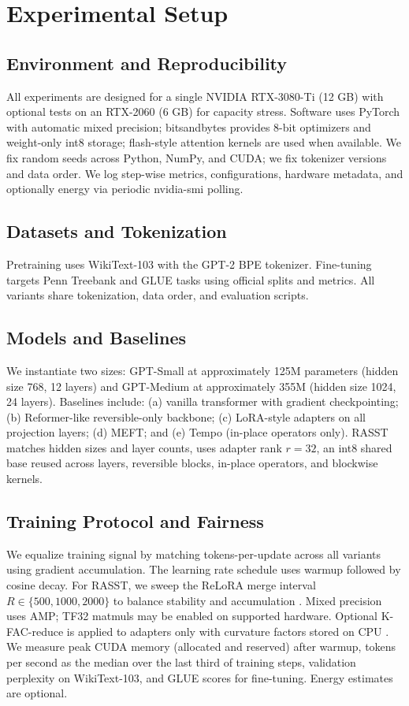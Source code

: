 \documentclass{article}
\begin{document}
\section{Experimental Setup}
\subsection{Environment and Reproducibility}
All experiments are designed for a single NVIDIA RTX-3080-Ti (12 GB) with optional tests on an RTX-2060 (6 GB) for capacity stress. Software uses PyTorch with automatic mixed precision; bitsandbytes provides 8-bit optimizers and weight-only int8 storage; flash-style attention kernels are used when available. We fix random seeds across Python, NumPy, and CUDA; we fix tokenizer versions and data order. We log step-wise metrics, configurations, hardware metadata, and optionally energy via periodic nvidia-smi polling.

\subsection{Datasets and Tokenization}
Pretraining uses WikiText-103 with the GPT-2 BPE tokenizer. Fine-tuning targets Penn Treebank and GLUE tasks using official splits and metrics. All variants share tokenization, data order, and evaluation scripts.

\subsection{Models and Baselines}
We instantiate two sizes: GPT-Small at approximately 125M parameters (hidden size 768, 12 layers) and GPT-Medium at approximately 355M (hidden size 1024, 24 layers). Baselines include: (a) vanilla transformer with gradient checkpointing; (b) Reformer-like reversible-only backbone; (c) LoRA-style adapters on all projection layers; (d) MEFT; and (e) Tempo (in-place operators only). RASST matches hidden sizes and layer counts, uses adapter rank \(r = 32\), an int8 shared base reused across layers, reversible blocks, in-place operators, and blockwise kernels.

\subsection{Training Protocol and Fairness}
We equalize training signal by matching tokens-per-update across all variants using gradient accumulation. The learning rate schedule uses warmup followed by cosine decay. For RASST, we sweep the ReLoRA merge interval \(R \in \{500, 1000, 2000\}\) to balance stability and accumulation \cite{lialin-2023-relora}. Mixed precision uses AMP; TF32 matmuls may be enabled on supported hardware. Optional K-FAC-reduce is applied to adapters only with curvature factors stored on CPU \cite{eschenhagen-2023-kronecker}. We measure peak CUDA memory (allocated and reserved) after warmup, tokens per second as the median over the last third of training steps, validation perplexity on WikiText-103, and GLUE scores for fine-tuning. Energy estimates are optional.
\end{document}
